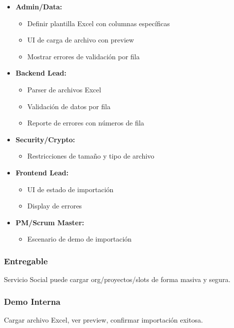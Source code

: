 \documentclass[12pt,a4paper]{article}
\begin{document}
\begin{itemize}[leftmargin=*]
    \item \textbf{Admin/Data:}
    \begin{itemize}
        \item Definir plantilla Excel con columnas específicas
        \item UI de carga de archivo con preview
        \item Mostrar errores de validación por fila
    \end{itemize}
    
    \item \textbf{Backend Lead:}
    \begin{itemize}
        \item Parser de archivos Excel
        \item Validación de datos por fila
        \item Reporte de errores con números de fila
    \end{itemize}
    
    \item \textbf{Security/Crypto:}
    \begin{itemize}
        \item Restricciones de tamaño y tipo de archivo
    \end{itemize}
    
    \item \textbf{Frontend Lead:}
    \begin{itemize}
        \item UI de estado de importación
        \item Display de errores
    \end{itemize}
    
    \item \textbf{PM/Scrum Master:}
    \begin{itemize}
        \item Escenario de demo de importación
    \end{itemize}
\end{itemize}

\subsubsection{Entregable}
Servicio Social puede cargar org/proyectos/slots de forma masiva y segura.

\subsubsection{Demo Interna}
Cargar archivo Excel, ver preview, confirmar importación exitosa.
\end{document}
